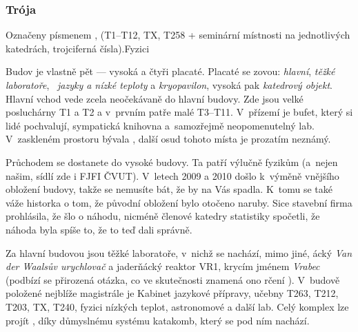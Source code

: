 \subsubsection{Trója}
 {Označeny písmenem ,
(T1--T12, TX, T258 + seminární místnosti na jednotlivých
katedrách,  trojciferná čísla).}{Fyzici}

Budov je vlastně pět ---  vysoká a čtyři placaté. Placaté se zovou:
\emph{hlavní}, \emph{těžké laboratoře\/}, ~\emph{jazyky a nízké
teploty} a \emph{kryopavilon}, vysoká pak \emph{katedrový objekt}.
Hlavní vchod vede zcela neočekávaně do hlavní budovy. Zde jsou
velké posluchárny T1 a T2 a v~prvním patře malé T3--T11. V~přízemí
je bufet, který si lidé pochvalují, sympatická knihovna
a~samozřejmě neopomenutelný lab. V~zaskleném prostoru bývala
\SKP, další osud tohoto místa je prozatím neznámý. 

Průchodem se
dostanete do vysoké budovy. Ta patří výlučně fyzikům (a~nejen
našim, sídlí zde i FJFI ČVUT). V~letech 2009 a 2010 došlo k~výměně
vnějšího obložení budovy, takže se nemusíte bát, že by na Vás
spadla. K~tomu se také váže historka o tom, že původní obložení bylo otočeno naruby. Sice stavební firma prohlásila, že šlo o náhodu, nicméně členové katedry statistiky spočetli, že náhoda byla spíše to, že to teď dali správně.

Za hlavní budovou jsou těžké laboratoře, v~nichž se nachází, mimo
jiné, \mfz{}ácký {\it Van der Waalsův urychlovač\/} a jaderňácký
reaktor VR1, krycím jménem {\it Vrabec\/} (podbízí se přirozená
otázka, co ve skutečnosti znamená ono rčení ). V~budově položené nejblíže magistrále je Kabinet
jazykové přípravy, učebny T263, T212, T203, TX, T240, fyzici
nízkých teplot, astronomové a další lab.  Celý komplex lze projít
, díky důmyslnému systému katakomb, který se pod
ním nachází.
